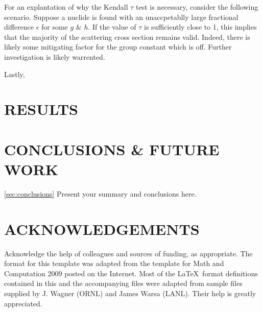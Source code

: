 \documentclass{physor2012}
\begin{document}
For an explantation of why the Kendall $\tau$ test is necessary, consider the following
scenario.  Suppose a nuclide is found with an unaccpetablly large fractional 
difference $\epsilon$ for some $g$ \& $h$.  If the value of $\tau$ is sufficiently
close to 1, this implies that the majority of the scattering cross section 
remains valid.  Indeed, there is likely some mitigating factor for the 
group constant which is off.  Further investigation is likely warrented.

Lastly, 

\section{RESULTS} 
\label{sec:results}


%
\section{CONCLUSIONS \& FUTURE WORK}
\ref{sec:conclusions}
%
Present your summary and conclusions here.
%
\section*{ACKNOWLEDGEMENTS}
%
Acknowledge the help of colleagues and sources of funding, as appropriate.
%
The format for this template was adapted from the template for Math and Computation 2009 
posted on the Internet.  Most of the \LaTeX\ format definitions contained
in this and the accompanying files were adapted from sample files supplied 
by J. Wagner (ORNL) and James Warsa (LANL). Their help is greatly appreciated.

%
\setlength{\baselineskip}{12pt}


\end{document}
